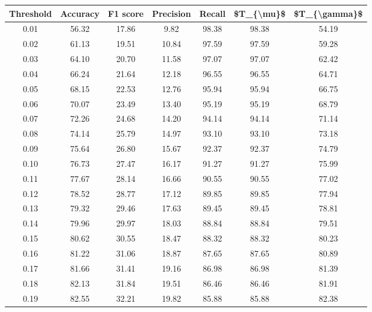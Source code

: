 \begin{tabular}{|c|c|c|c|c|c|c|}
\hline
 Threshold &  Accuracy &  F1 score &  Precision &  Recall &  \$T\_\{\textbackslash mu\}\$ &  \$T\_\{\textbackslash gamma\}\$ \\
\hline
      0.01 &     56.32 &     17.86 &       9.82 &   98.38 &      98.38 &         54.19 \\
      0.02 &     61.13 &     19.51 &      10.84 &   97.59 &      97.59 &         59.28 \\
      0.03 &     64.10 &     20.70 &      11.58 &   97.07 &      97.07 &         62.42 \\
      0.04 &     66.24 &     21.64 &      12.18 &   96.55 &      96.55 &         64.71 \\
      0.05 &     68.15 &     22.53 &      12.76 &   95.94 &      95.94 &         66.75 \\
      0.06 &     70.07 &     23.49 &      13.40 &   95.19 &      95.19 &         68.79 \\
      0.07 &     72.26 &     24.68 &      14.20 &   94.14 &      94.14 &         71.14 \\
      0.08 &     74.14 &     25.79 &      14.97 &   93.10 &      93.10 &         73.18 \\
      0.09 &     75.64 &     26.80 &      15.67 &   92.37 &      92.37 &         74.79 \\
      0.10 &     76.73 &     27.47 &      16.17 &   91.27 &      91.27 &         75.99 \\
      0.11 &     77.67 &     28.14 &      16.66 &   90.55 &      90.55 &         77.02 \\
      0.12 &     78.52 &     28.77 &      17.12 &   89.85 &      89.85 &         77.94 \\
      0.13 &     79.32 &     29.46 &      17.63 &   89.45 &      89.45 &         78.81 \\
      0.14 &     79.96 &     29.97 &      18.03 &   88.84 &      88.84 &         79.51 \\
      0.15 &     80.62 &     30.55 &      18.47 &   88.32 &      88.32 &         80.23 \\
      0.16 &     81.22 &     31.06 &      18.87 &   87.65 &      87.65 &         80.89 \\
      0.17 &     81.66 &     31.41 &      19.16 &   86.98 &      86.98 &         81.39 \\
      0.18 &     82.13 &     31.84 &      19.51 &   86.46 &      86.46 &         81.91 \\
      0.19 &     82.55 &     32.21 &      19.82 &   85.88 &      85.88 &         82.38 \\

\end{tabular}
